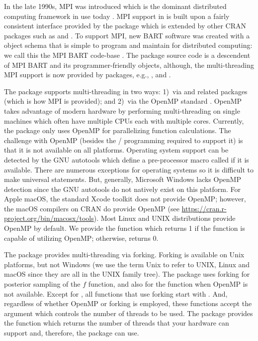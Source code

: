 \documentclass[article]{jss}
\begin{document}
In the late 1990s, MPI
\citep{WalkDong96} was introduced which is the dominant distributed
computing framework in use today \citep{GabrFagg04}.
MPI support in  is built upon a fairly consistent
interface provided by the  package \citep{RCor18} which
is extended by other CRAN packages such as 
\citep{TierRoss16} and  \citep{Yu17}.  To support MPI, new BART
software was created with a  object schema
that is simple to program and maintain for distributed computing: we
call this the MPI BART code-base \citep{PratChip14}.  The 
package source code is a descendent of MPI BART and its
programmer-friendly objects, although, the multi-threading MPI support
is now provided by  packages, e.g., ,
 and .

The  package supports multi-threading in two ways: 1)~via
 and related packages (which is how MPI is provided);
and 2)~via the OpenMP standard \citep{DaguMeno98}.  OpenMP takes
advantage of modern hardware by performing multi-threading on single
machines which often have multiple CPUs each with multiple cores.
Currently, the  package only uses OpenMP for parallelizing
 function calculations.  The challenge with OpenMP
(besides the / programming required to
support it) is that it is not available on all platforms.
Operating system support can be detected by the GNU autotools
\citep{Calc10} which define a  pre-processor macro called
 if it is available.  There are numerous exceptions for
operating systems so it is difficult to make universal statements.
But, generally, Microsoft Windows lacks OpenMP detection since the GNU
autotools do not natively exist on this platform.  For Apple macOS,
the standard Xcode toolkit does not provide OpenMP; however, the macOS
compilers on CRAN do provide OpenMP (see
\url{https://cran.r-project.org/bin/macosx/tools}).  Most Linux and
UNIX distributions provide OpenMP by default.  We provide the function
 which returns 1 if the  function
is capable of utilizing OpenMP; otherwise, returns 0.

The  package provides multi-threading via forking.
Forking is available on Unix platforms, but not Windows (we use the
term Unix to refer to UNIX, Linux and macOS since they are all in the
UNIX family tree).  The  package uses forking for posterior
sampling of the $f$ function, and also for the  function
when OpenMP is not available.  Except for , all
functions that use forking start with .  And, regardless of
whether OpenMP or forking is employed, these functions accept the
argument  which controls the number of threads to be
used.  The  package provides the function
 which returns the number of threads that your
hardware can support and, therefore, the  package can use.
\end{document}
